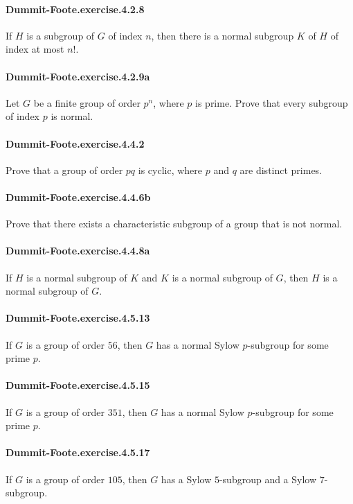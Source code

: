 \documentclass{article}
\begin{document}
\paragraph{Dummit-Foote.exercise.4.2.8} If $H$ is a subgroup of $G$ of index $n$, then there is a normal subgroup $K$ of $H$ of index at most $n!$.

\paragraph{Dummit-Foote.exercise.4.2.9a} Let $G$ be a finite group of order $p^n$, where $p$ is prime. Prove that every subgroup of index $p$ is normal.

\paragraph{Dummit-Foote.exercise.4.4.2} Prove that a group of order $pq$ is cyclic, where $p$ and $q$ are distinct primes.

\paragraph{Dummit-Foote.exercise.4.4.6b} Prove that there exists a characteristic subgroup of a group that is not normal.

\paragraph{Dummit-Foote.exercise.4.4.8a} If $H$ is a normal subgroup of $K$ and $K$ is a normal subgroup of $G$, then $H$ is a normal subgroup of $G$.

\paragraph{Dummit-Foote.exercise.4.5.13} If $G$ is a group of order $56$, then $G$ has a normal Sylow $p$-subgroup for some prime $p$.

\paragraph{Dummit-Foote.exercise.4.5.15} If $G$ is a group of order $351$, then $G$ has a normal Sylow $p$-subgroup for some prime $p$.

\paragraph{Dummit-Foote.exercise.4.5.17} If $G$ is a group of order $105$, then $G$ has a Sylow $5$-subgroup and a Sylow $7$-subgroup.
\end{document}
